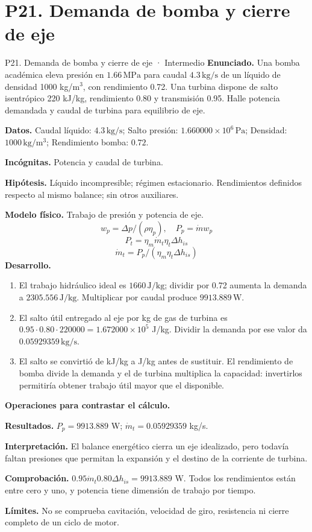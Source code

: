 \section{P21. Demanda de bomba y cierre de eje}
\begin{studiumworked}{P21. Demanda de bomba y cierre de eje · Intermedio}
\textbf{Enunciado.} Una bomba académica eleva presión en $1.66\,\mathrm{MPa}$ para caudal $4.3\,\mathrm{kg/s}$ de un líquido de densidad 1000 kg/m$^3$, con rendimiento 0.72. Una turbina dispone de salto isentrópico 220 kJ/kg, rendimiento 0.80 y transmisión 0.95. Halle potencia demandada y caudal de turbina para equilibrio de eje.

\textbf{Datos.} Caudal líquido: $4.3\,\mathrm{kg/s}$; Salto presión: $1.660000\times10^{6}\,\mathrm{Pa}$; Densidad: $1000\,\mathrm{kg/m^3}$; Rendimiento bomba: $0.72$.

\textbf{Incógnitas.} Potencia y caudal de turbina.

\textbf{Hipótesis.} Líquido incompresible; régimen estacionario. Rendimientos definidos respecto al mismo balance; sin otros auxiliares.

\textbf{Modelo físico.} Trabajo de presión y potencia de eje.
\[w_p=\Delta p/(\rho\eta_p),\quad P_p=\dot m w_p\]
\[P_t=\eta_m\dot m_t\eta_t\Delta h_{is}\]
\[\dot m_t=P_p/(\eta_m\eta_t\Delta h_{is})\]
\textbf{Desarrollo.}
\begin{enumerate}
\item El trabajo hidráulico ideal es $1660\,\mathrm{J/kg}$; dividir por 0.72 aumenta la demanda a $2305.556\,\mathrm{J/kg}$. Multiplicar por caudal produce $9913.889\,\mathrm{W}$.
\item El salto útil entregado al eje por kg de gas de turbina es $0.95\cdot0.80\cdot220000=1.672000\times10^{5}$ J/kg. Dividir la demanda por ese valor da $0.05929359\,\mathrm{kg/s}$.
\item El salto se convirtió de kJ/kg a J/kg antes de sustituir. El rendimiento de bomba divide la demanda y el de turbina multiplica la capacidad: invertirlos permitiría obtener trabajo útil mayor que el disponible.
\end{enumerate}
\textbf{Operaciones para contrastar el cálculo.}

\textbf{Resultados.} $P_p=9913.889$ W; $\dot m_t=0.05929359$ kg/s.

\textbf{Interpretación.} El balance energético cierra un eje idealizado, pero todavía faltan presiones que permitan la expansión y el destino de la corriente de turbina.

\textbf{Comprobación.} $0.95\dot m_t0.80\Delta h_{is}=9913.889$ W. Todos los rendimientos están entre cero y uno, y potencia tiene dimensión de trabajo por tiempo.

\textbf{Límites.} No se comprueba cavitación, velocidad de giro, resistencia ni cierre completo de un ciclo de motor.
\end{studiumworked}
